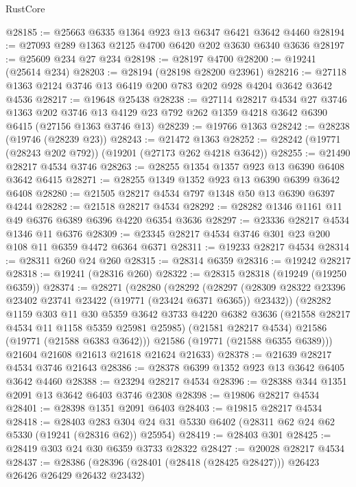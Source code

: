 \begin{lexlean}{RustCore}
\begin{coremodule}
@28185 := @25663 @6335 @1364 @923 @13 @6347 @6421 @3642 @4460
@28194 := @27093 @289 @1363 @2125 @4700 @6420 @202 @3630 @6340 @3636
@28197 := @25609 @234 @27 @234
@28198 := @28197 @4700
@28200 := @19241 (@25614 @234)
@28203 := @28194 (@28198 @28200 @23961)
@28216 := @27118 @1363 @2124 @3746 @13 @6419 @200 @783 @202 @928 @4204 @3642 @3642 @4536
@28217 := @19648 @25438
@28238 := @27114
    @28217
    @4534
    @27
    @3746
    @1363
    @202
    @3746
    @13
    @4129
    @23
    @792
    @262
    @1359
    @4218
    @3642
    @6390
    @6415
    (@27156 @1363 @3746 @13)
@28239 := @19766 @1363
@28242 := @28238 (@19746 (@28239 @23))
@28243 := @21472 @1363
@28252 := @28242 (@19771 (@28243 @202 @792)) (@19201 (@27173 @262 @4218 @3642))
@28255 := @21490 @28217 @4534 @3746
@28263 := @28255 @1354 @1357 @923 @13 @6390 @6408 @3642 @6415
@28271 := @28255 @1349 @1352 @923 @13 @6390 @6399 @3642 @6408
@28280 := @21505 @28217 @4534 @797 @1348 @50 @13 @6390 @6397 @4244
@28282 := @21518 @28217 @4534
@28292 := @28282 @1346 @1161 @11 @49 @6376 @6389 @6396 @4220 @6354 @3636
@28297 := @23336 @28217 @4534 @1346 @11 @6376
@28309 := @23345 @28217 @4534 @3746 @301 @23 @200 @108 @11 @6359 @4472 @6364 @6371
@28311 := @19233 @28217 @4534
@28314 := @28311 @260 @24 @260
@28315 := @28314 @6359
@28316 := @19242 @28217
@28318 := @19241 (@28316 @260)
@28322 := @28315 @28318 (@19249 (@19250 @6359))
@28374 := @28271
    (@28280
      (@28292
        (@28297 (@28309 @28322 @23396 @23402 @23741 @23422 (@19771 (@23424 @6371 @6365)) @23432))
        (@28282
          @1159
          @303
          @11
          @30
          @5359
          @3642
          @3733
          @4220
          @6382
          @3636
          (@21558 @28217 @4534 @11 @1158 @5359 @25981 @25985)
          (@21581 @28217 @4534)
          @21586
          (@19771 (@21588 @6383 @3642)))
        @21586
        (@19771 (@21588 @6355 @6389)))
      @21604
      @21608
      @21613
      @21618
      @21624
      @21633)
@28378 := @21639 @28217 @4534 @3746 @21643
@28386 := @28378 @6399 @1352 @923 @13 @3642 @6405 @3642 @4460
@28388 := @23294 @28217 @4534
@28396 := @28388 @344 @1351 @2091 @13 @3642 @6403 @3746 @2308
@28398 := @19806 @28217 @4534
@28401 := @28398 @1351 @2091 @6403
@28403 := @19815 @28217 @4534
@28418 := @28403
    @283
    @304
    @24
    @31
    @5330
    @6402
    (@28311 @62 @24 @62 @5330 (@19241 (@28316 @62)) @25954)
@28419 := @28403 @301
@28425 := @28419 @303 @24 @30 @6359 @3733 @28322
@28427 := @20028 @28217 @4534
@28437 := @28386 (@28396 (@28401 (@28418 (@28425 @28427))) @26423 @26426 @26429 @26432 @23432)

\end{coremodule}
\end{lexlean}
